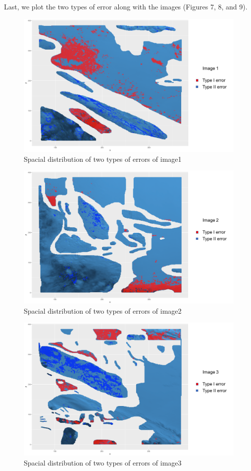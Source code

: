 \documentclass{article}\usepackage[]{graphicx}\usepackage[]{color}
\begin{document}
Last, we plot the two types of error along with the images (Figures 7, 8, and 9).
\begin{figure}[h!]
\caption{Spacial distribution of two types of errors of image1}
\includegraphics[width = \textwidth]{figures/img1.png}
\end{figure}
\begin{figure}[h!]
\caption{Spacial distribution of two types of errors of image2}
\includegraphics[width = \textwidth]{figures/img2.png}
\end{figure}
\begin{figure}[h!]
\caption{Spacial distribution of two types of errors of image3}
\includegraphics[width = \textwidth]{figures/img3.png}
\end{figure}
\end{document}
